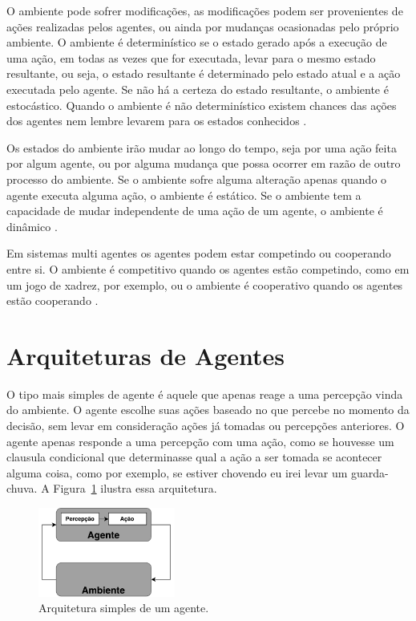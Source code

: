 O ambiente pode sofrer modificações, as modificações podem ser provenientes de ações realizadas pelos agentes, ou ainda por mudanças ocasionadas pelo próprio ambiente. O ambiente é determinístico se o estado gerado após a execução de uma ação, em todas as vezes que for executada, levar para o mesmo estado resultante, ou seja, o estado resultante é determinado pelo estado atual e a ação executada pelo agente. Se não há a certeza do estado resultante, o ambiente é estocástico. Quando o ambiente é não determinístico existem chances das ações dos agentes nem lembre levarem para os estados conhecidos \cite{intelligence2003modern}. 

Os estados do ambiente irão mudar ao longo do tempo, seja por uma ação feita por algum agente, ou por alguma mudança que possa ocorrer em razão de outro processo do ambiente. Se o ambiente sofre alguma alteração apenas quando o agente executa alguma ação, o ambiente é estático. Se o ambiente tem a capacidade de mudar independente de uma ação de um agente, o ambiente é dinâmico \cite{agent1999}.

Em sistemas multi agentes os agentes podem estar competindo ou cooperando entre si. O ambiente é competitivo quando os agentes estão competindo, como em um jogo de xadrez, por exemplo, ou o ambiente é cooperativo quando os agentes estão cooperando \cite{intelligence2003modern}.

\section{Arquiteturas de Agentes}


O tipo mais simples de agente é aquele que apenas reage a uma percepção vinda do ambiente. O agente escolhe suas ações baseado no que percebe no momento da decisão, sem levar em consideração ações já tomadas ou percepções anteriores. O agente apenas responde a uma percepção com uma ação, como se houvesse um clausula condicional que determinasse qual a ação a ser tomada se acontecer alguma coisa, como por exemplo, se estiver chovendo eu irei levar um guarda-chuva. A Figura~\ref{fig:agenteSimple} ilustra essa arquitetura. 

\begin{figure}[ht]
	\centering
	\includegraphics[width=0.4\textwidth]{fig/agentSimple.pdf}
	\caption{Arquitetura simples de um agente.}
	\label{fig:agenteSimple}
\end{figure} 


